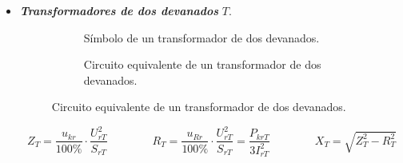 \begin{itemize}
            \item \textbf{\textit{Transformadores de dos devanados}} $T$. 
                \begin{figure}[H]
                    \begin{minipage}{0.5\textwidth}
                        \begin{figure}[H]
                            \centering
                            \caption{Símbolo de un transformador de dos devanados.}
                            \label{fig:trafo2simbolo}
                        \end{figure}
                    \end{minipage}%
                    \begin{minipage}{0.5\textwidth}
                        \begin{figure}[H]
                            \centering
                            \caption{Circuito equivalente de un transformador de dos devanados.}
                            \label{fig:trafo2cto}
                        \end{figure}
                    \end{minipage}%
                \end{figure}

                \begin{equation}
                    Z_\textit{T} = \dfrac{u_\textit{kr}}{100\!\text{\%}}\cdot \dfrac{U_\textit{rT}^2}{S_\textit{rT}} \qquad\qquad 
                    R_\textit{T} = \dfrac{u_\textit{Rr}}{100\!\text{\%}}\cdot \dfrac{U_\textit{rT}^2}{S_\textit{rT}} = \dfrac{P_\textit{krT}}{3I_\textit{rT}^2} \qquad \qquad
                    X_\textit{T} = \sqrt{Z_\textit{T}^2 - R_\textit{T}^2}
                \end{equation}


\end{itemize}
